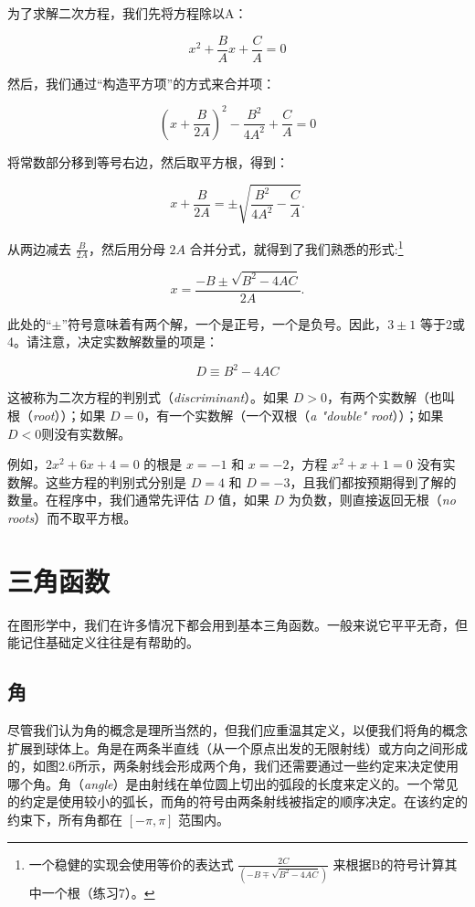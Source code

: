 \documentclass[lang=cn,12pt]{elegantbook}
\begin{document}
为了求解二次方程，我们先将方程除以A：

$$x^2+\frac{B}{A} x+\frac{C}{A}=0$$

然后，我们通过“构造平方项”的方式来合并项：

$$\left(x+\frac{B}{2 A}\right)^{2}-\frac{B^{2}}{4 A^{2}}+\frac{C}{A}=0$$

将常数部分移到等号右边，然后取平方根，得到：

$$
  x+\frac{B}{2 A}=\pm \sqrt{\frac{B^{2}}{4 A^{2}}-\frac{C}{A}} .
$$

从两边减去 $\frac{B}{2 A}$，然后用分母 $2A$ 合并分式，就得到了我们熟悉的形式:\footnote[1]{一个稳健的实现会使用等价的表达式 $\frac{2C}{\left(-B \mp \sqrt{B^{2}-4 A C}\right)}$ 来根据B的符号计算其中一个根（练习7）。}


\begin{equation} x=\frac{-B \pm \sqrt{B^{2}-4 A C}}{2 A} . \end{equation}

此处的“$\pm$”符号意味着有两个解，一个是正号，一个是负号。因此，$3\pm1$ 等于2或4。请注意，决定实数解数量的项是：

$$
  D \equiv B^{2}-4 A C
$$

这被称为二次方程的判别式（\textit{discriminant}）。如果 $D>0$，有两个实数解（也叫根（\textit{root}））；如果 $D=0$，有一个实数解（一个双根（\textit{a "double" root}））；如果 $D<0$则没有实数解。

例如，$2x^2+6x+4=0$ 的根是 $x=-1$ 和 $x=-2$，方程 $x^2+x+1=0$ 没有实数解。这些方程的判别式分别是 $D=4$ 和 $D=-3$，且我们都按预期得到了解的数量。在程序中，我们通常先评估 $D$ 值，如果 $D$ 为负数，则直接返回无根（\textit{no roots}）而不取平方根。

\section{三角函数}

在图形学中，我们在许多情况下都会用到基本三角函数。一般来说它平平无奇，但能记住基础定义往往是有帮助的。

\subsection{角}

尽管我们认为角的概念是理所当然的，但我们应重温其定义，以便我们将角的概念扩展到球体上。角是在两条半直线（从一个原点出发的无限射线）或方向之间形成的，如图2.6所示，两条射线会形成两个角，我们还需要通过一些约定来决定使用哪个角。角（\textit{angle}）是由射线在单位圆上切出的弧段的长度来定义的。一个常见的约定是使用较小的弧长，而角的符号由两条射线被指定的顺序决定。在该约定的约束下，所有角都在 $[-\pi, \pi]$ 范围内。
\end{document}
